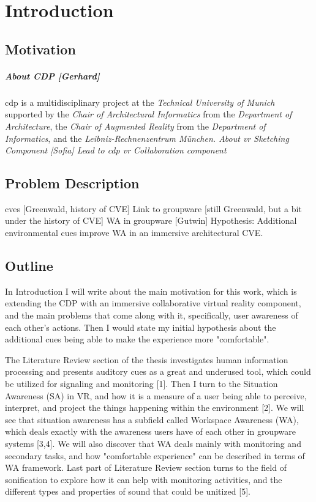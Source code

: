 



\chapter{Introduction}

\section{Motivation}
\paragraph{About CDP [Gerhard]} \gls{cdp} is a multidisciplinary project at the \textit{Technical University of Munich} supported by the \textit{Chair of Architectural Informatics} from the \textit{Department of Architecture}, the \textit{Chair of Augmented Reality} from the \textit{Department of Informatics}, and the \itshape{Leibniz-Rechnenzentrum M{\"u}nchen}.
About \gls{vr} Sketching Component [Sofia]
Lead to \gls{cdp} \gls{vr} Collaboration component
\section{Problem Description}
\gls{cve}s [Greenwald, history of CVE]
Link to groupware [still Greenwald, but a bit under the history of CVE]
WA in groupware [Gutwin]
Hypothesis: Additional environmental cues improve WA in an immersive architectural CVE.
\section{Outline}
In Introduction I will write about the main motivation for this work, which is extending the CDP with an immersive collaborative virtual reality component, and the main problems that come along with it, specifically, user awareness of each other's actions. Then I would state my initial hypothesis about the additional cues being able to make the experience more "comfortable".

The Literature Review section of the thesis investigates human information processing and presents auditory cues as a great and underused tool, which could be utilized for signaling and monitoring [1]. Then I turn to the Situation Awareness (SA) in VR, and how it is a measure of a user being able to perceive, interpret, and project the things happening within the environment [2]. We will see that situation awareness has a subfield called Workspace Awareness (WA), which deals exactly with the awareness users have of each other in groupware systems [3,4]. We will also discover that WA deals mainly with monitoring and secondary tasks, and how "comfortable experience" can be described in terms of WA framework. Last part of Literature Review section turns to the field of sonification to explore how it can help with monitoring activities, and the different types and properties of sound that could be unitized [5].

